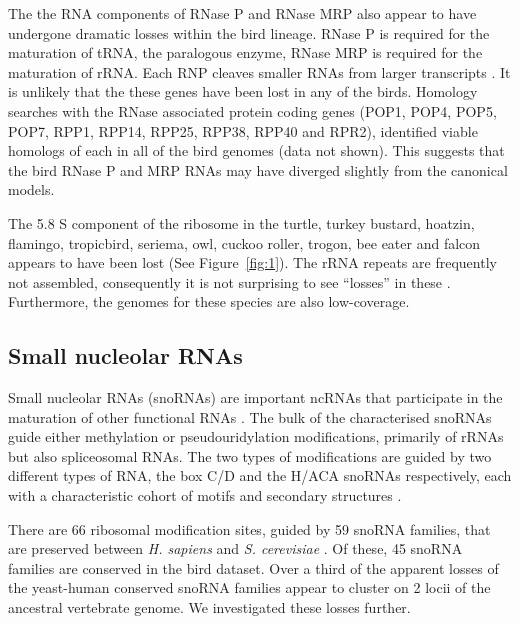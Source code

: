 \documentclass[10pt]{bmc_article}
\newenvironment{bmcformat}{\begin{raggedright}\baselineskip20pt\sloppy\setboolean{publ}{false}}{\end{raggedright}\baselineskip20pt\sloppy}
\begin{document}
\begin{bmcformat}
The the RNA components of RNase P and RNase MRP also appear to have
undergone dramatic losses within the bird lineage. RNase P is required
for the maturation of tRNA, the paralogous enzyme, RNase MRP is
required for the maturation of rRNA. Each RNP cleaves smaller RNAs
from larger transcripts \cite{Lopez:2009}. It is unlikely that the
these genes have been lost in any of the birds. Homology searches with
the RNase associated protein coding genes (POP1, POP4, POP5, POP7,
RPP1, RPP14, RPP25, RPP38, RPP40 and RPR2), identified viable homologs
of each in all of the bird genomes \cite{Rosenblad:2006} (data not
shown). This suggests that the bird RNase P and MRP RNAs may have
diverged slightly from the canonical models.

The 5.8 S component of the ribosome in the turtle, turkey bustard,
hoatzin, flamingo, tropicbird, seriema, owl, cuckoo roller, trogon,
bee eater and falcon appears to have been lost (See
Figure~\ref{fig:1}). The rRNA repeats are frequently not assembled,
consequently it is not surprising to see ``losses'' in these \cite{Floutsakou:2013}.
Furthermore, the genomes for these species are also
low-coverage.


\subsection*{Small nucleolar RNAs}

Small nucleolar RNAs (snoRNAs) are important ncRNAs that participate
in the maturation of other functional RNAs \cite{Gardner:2010}. The
bulk of the characterised snoRNAs guide either methylation or
pseudouridylation modifications, primarily of rRNAs but also
spliceosomal RNAs. The two types of modifications are guided by two
different types of RNA, the box C/D and the H/ACA snoRNAs
respectively, each with a characteristic cohort of motifs and
secondary structures \cite{Marz:2011}.

There are 66 ribosomal modification sites, guided by 59 snoRNA
families, that are preserved between \emph{H. sapiens} and
\emph{S. cerevisiae} \cite{Lestrade:2006}. Of these, 45 snoRNA
families are conserved in the bird dataset.
Over a third of the apparent losses of the yeast-human conserved
snoRNA families appear to cluster on 2 locii of the ancestral
vertebrate genome. We investigated these losses further.


\end{bmcformat}
\end{document}
